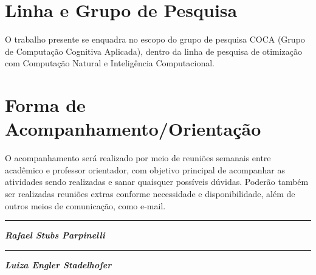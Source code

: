 \documentclass[11pt]{article}
\begin{document}
\section{Linha e Grupo de Pesquisa}

O trabalho presente se enquadra no escopo do grupo de pesquisa COCA (Grupo de Computação Cognitiva Aplicada), dentro da linha de pesquisa de otimização com Computação Natural e Inteligência Computacional.

\section{Forma de Acompanhamento/Orientação}

O acompanhamento será realizado por meio de reuniões semanais entre acadêmico e professor orientador, com objetivo principal de acompanhar as atividades sendo realizadas e sanar quaisquer possíveis dúvidas. Poderão também ser realizadas reuniões extras conforme necessidade e disponibilidade, além de outros meios de comunicação, como e-mail.







\vskip 2.5cm

\begin{minipage} {0.49\linewidth}
  \centering
  \rule{7.2cm}{0.1mm}

  \textbf{\textit{Rafael Stubs Parpinelli}}
\end{minipage}
\begin{minipage} {0.49\linewidth}
  \centering
  \rule{7.2cm}{0.1mm}

  \textbf{\textit{Luiza Engler Stadelhofer}}
\end{minipage}


%


\end{document}
